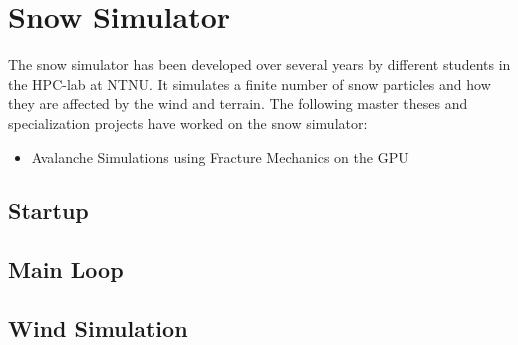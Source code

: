 \section{Snow Simulator}

The snow simulator has been developed over several years by different students in 
the HPC-lab at NTNU. It simulates a finite number of snow particles and how they 
are affected by the wind and terrain. The following master theses and specialization 
projects have worked on the snow simulator:

\begin{itemize}
	\item Avalanche Simulations using Fracture Mechanics on the GPU\cite{avalancheThesis}
\end{itemize}

\subsection{Startup}

\subsection{Main Loop}

\subsection{Wind Simulation}

